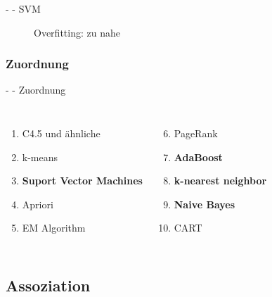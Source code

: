 \documentclass[fleqn,11pt,aspectratio=43]{beamer}
\begin{document}
\begin{frame}{\insertsectionhead - \insertsubsectionhead - SVM}
\begin{figure}
\scalebox{1.1}{}
\caption{Overfitting: zu nahe}
\end{figure}
\end{frame}

\subsubsection{Zuordnung}

\begin{frame}{\insertsectionhead - \insertsubsectionhead - Zuordnung}
\begin{columns}[onlytextwidth]
		\begin{enumerate}[label=\bfseries\arabic*.]
		\item C4.5 und ähnliche %
		\item k-means %
		\item \textbf{Suport Vector Machines} %
		\item Apriori %
		\item EM Algorithm %
		\end{enumerate}
	    \begin{enumerate}[label=\bfseries\arabic*.]
	    \setcounter{enumi}{5}
	    \item PageRank
	    \item \textbf{AdaBoost} %
	    \item \textbf{k-nearest neighbor} %
	    \item \textbf{Naive Bayes} %
	    \item CART %
	    \end{enumerate}
\end{columns}
\end{frame}

%
%

\subsection{Assoziation~}
\end{document}
